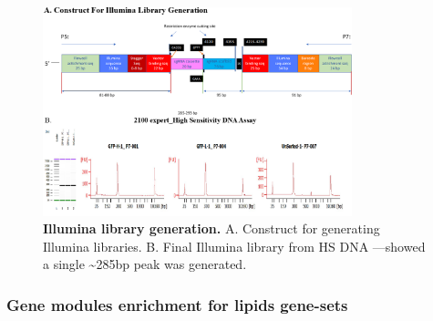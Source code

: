 \documentclass[
  a4paper,
]{article}
\newenvironment{fignos:tagged-figure}[1][]{
  \let\oldfigurename\figurename
  \renewcommand{\figurename}{Supplementary Figure}
}{
  \let\figurename\oldfigurename
}
\begin{document}
\begin{fignos:tagged-figure}[S12]

\begin{figure}
\hypertarget{fig:sup:crispr:fig4}{%
\centering
\includegraphics[width=0.8\textwidth,height=\textheight]{images/crispr/figure4.png}
\caption{\textbf{Illumina library generation.}
A. Construct for generating Illumina libraries.
B. Final Illumina library from HS DNA ---showed a single \textasciitilde285bp peak was generated.}\label{fig:sup:crispr:fig4}
}
\end{figure}

\end{fignos:tagged-figure}

\clearpage

\hypertarget{gene-modules-enrichment-for-lipids-gene-sets}{%
\subsubsection{Gene modules enrichment for lipids gene-sets}\label{gene-modules-enrichment-for-lipids-gene-sets}}
\end{document}
